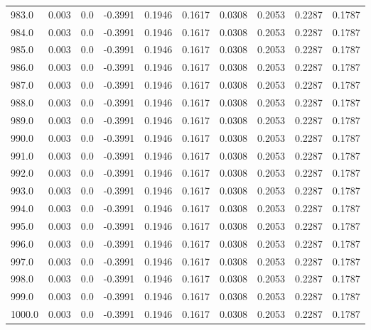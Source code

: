 \begin{longtable}{lrrrrrrrrr}
983.0 & 0.003 & 0.0 & -0.3991 & 0.1946 & 0.1617 & 0.0308 & 0.2053 & 0.2287 & 0.1787 \\
984.0 & 0.003 & 0.0 & -0.3991 & 0.1946 & 0.1617 & 0.0308 & 0.2053 & 0.2287 & 0.1787 \\
985.0 & 0.003 & 0.0 & -0.3991 & 0.1946 & 0.1617 & 0.0308 & 0.2053 & 0.2287 & 0.1787 \\
986.0 & 0.003 & 0.0 & -0.3991 & 0.1946 & 0.1617 & 0.0308 & 0.2053 & 0.2287 & 0.1787 \\
987.0 & 0.003 & 0.0 & -0.3991 & 0.1946 & 0.1617 & 0.0308 & 0.2053 & 0.2287 & 0.1787 \\
988.0 & 0.003 & 0.0 & -0.3991 & 0.1946 & 0.1617 & 0.0308 & 0.2053 & 0.2287 & 0.1787 \\
989.0 & 0.003 & 0.0 & -0.3991 & 0.1946 & 0.1617 & 0.0308 & 0.2053 & 0.2287 & 0.1787 \\
990.0 & 0.003 & 0.0 & -0.3991 & 0.1946 & 0.1617 & 0.0308 & 0.2053 & 0.2287 & 0.1787 \\
991.0 & 0.003 & 0.0 & -0.3991 & 0.1946 & 0.1617 & 0.0308 & 0.2053 & 0.2287 & 0.1787 \\
992.0 & 0.003 & 0.0 & -0.3991 & 0.1946 & 0.1617 & 0.0308 & 0.2053 & 0.2287 & 0.1787 \\
993.0 & 0.003 & 0.0 & -0.3991 & 0.1946 & 0.1617 & 0.0308 & 0.2053 & 0.2287 & 0.1787 \\
994.0 & 0.003 & 0.0 & -0.3991 & 0.1946 & 0.1617 & 0.0308 & 0.2053 & 0.2287 & 0.1787 \\
995.0 & 0.003 & 0.0 & -0.3991 & 0.1946 & 0.1617 & 0.0308 & 0.2053 & 0.2287 & 0.1787 \\
996.0 & 0.003 & 0.0 & -0.3991 & 0.1946 & 0.1617 & 0.0308 & 0.2053 & 0.2287 & 0.1787 \\
997.0 & 0.003 & 0.0 & -0.3991 & 0.1946 & 0.1617 & 0.0308 & 0.2053 & 0.2287 & 0.1787 \\
998.0 & 0.003 & 0.0 & -0.3991 & 0.1946 & 0.1617 & 0.0308 & 0.2053 & 0.2287 & 0.1787 \\
999.0 & 0.003 & 0.0 & -0.3991 & 0.1946 & 0.1617 & 0.0308 & 0.2053 & 0.2287 & 0.1787 \\
1000.0 & 0.003 & 0.0 & -0.3991 & 0.1946 & 0.1617 & 0.0308 & 0.2053 & 0.2287 & 0.1787 \\
\end{longtable}